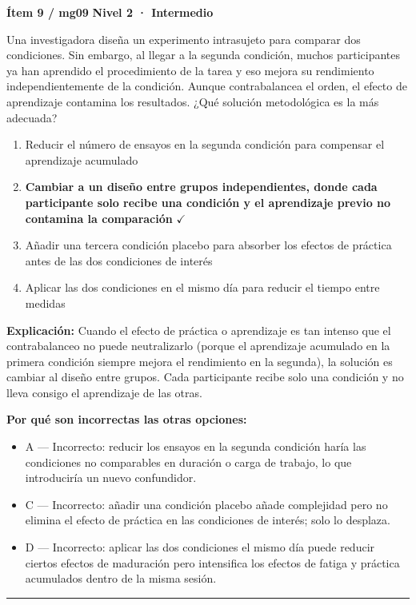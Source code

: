 \documentclass[12pt,a4paper]{article}
\begin{document}
\begin{mdframed}[backgroundcolor=fondogris,linecolor=ambar,linewidth=1pt,innerleftmargin=10pt,innerrightmargin=10pt,innertopmargin=7pt,innerbottommargin=7pt]
\textbf{Ítem 9 / mg09} \hfill {\small\bfseries\color{ambar} Nivel 2 · Intermedio}
\end{mdframed}

Una investigadora diseña un experimento intrasujeto para comparar dos condiciones. Sin embargo, al llegar a la segunda condición, muchos participantes ya han aprendido el procedimiento de la tarea y eso mejora su rendimiento independientemente de la condición. Aunque contrabalancea el orden, el efecto de aprendizaje contamina los resultados. ¿Qué solución metodológica es la más adecuada?

\begin{enumerate}
  \item[A.] Reducir el número de ensayos en la segunda condición para compensar el aprendizaje acumulado
  \item[\textbf{\color{verde}B.}] \textbf{\color{verde} Cambiar a un diseño entre grupos independientes, donde cada participante solo recibe una condición y el aprendizaje previo no contamina la comparación} \hfill $\checkmark$
  \item[C.] Añadir una tercera condición placebo para absorber los efectos de práctica antes de las dos condiciones de interés
  \item[D.] Aplicar las dos condiciones en el mismo día para reducir el tiempo entre medidas
\end{enumerate}

\noindent\textbf{\color{azul}Explicación:} Cuando el efecto de práctica o aprendizaje es tan intenso que el contrabalanceo no puede neutralizarlo (porque el aprendizaje acumulado en la primera condición siempre mejora el rendimiento en la segunda), la solución es cambiar al diseño entre grupos. Cada participante recibe solo una condición y no lleva consigo el aprendizaje de las otras.

\noindent\textbf{\color{gris}Por qué son incorrectas las otras opciones:}
\begin{itemize}
  \item {\small A — Incorrecto: reducir los ensayos en la segunda condición haría las condiciones no comparables en duración o carga de trabajo, lo que introduciría un nuevo confundidor.}
  \item {\small C — Incorrecto: añadir una condición placebo añade complejidad pero no elimina el efecto de práctica en las condiciones de interés; solo lo desplaza.}
  \item {\small D — Incorrecto: aplicar las dos condiciones el mismo día puede reducir ciertos efectos de maduración pero intensifica los efectos de fatiga y práctica acumulados dentro de la misma sesión.}
\end{itemize}
\vspace{8pt}\hrule\vspace{10pt}
\end{document}
